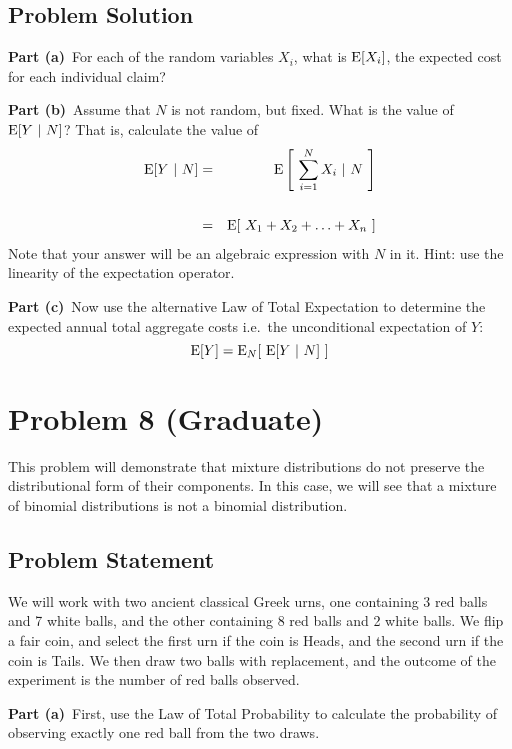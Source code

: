 \documentclass[12pt]{article}
\theoremstyle{definition}
\begin{document}
\subsection*{Problem Solution}

\bigskip
\noindent
{\bf Part (a)}\ For each of the random variables $X_i$, what is $\hbox{E}[X_i]$, the expected cost for each individual claim?


\newpage
\noindent
{\bf Part (b)}\ Assume that $N$ is not random, but fixed. What is the value of $\hbox{E}[Y\ |\ N]$? That is, calculate the value of 
\begin{eqnarray*}
	\hbox{E}[ Y\ |\ N] & = & \hbox{E} \left [\ \sum_{i=1}^N X_i\ |\ N\ \right ]\\
	\\
	& = & \hbox{E}[\ X_1 + X_2 + \ldots + X_n\ ]
\end{eqnarray*}
Note that your answer will be an algebraic expression with $N$ in it. Hint: use the linearity of the expectation operator.

\vspace{3in}
\noindent
{\bf Part (c)}\ Now use the alternative Law of Total Expectation to determine the expected annual total aggregate costs i.e.\ the unconditional expectation of $Y$:
$$
\hbox{E}[ Y ] = \hbox{E}_N[\ \hbox{E}[ Y\ |\ N]\ ]
$$

\newpage
\section*{Problem 8 (Graduate)}

This problem will demonstrate that mixture distributions do not preserve the distributional form of their components. In this case, we will see that a mixture of binomial distributions is not a binomial distribution.

\subsection*{Problem Statement}

We will work with two ancient classical Greek urns, one containing 3 red balls and 7 white balls, and the other containing 8 red balls and 2 white balls. We flip a fair coin, and select the first urn if the coin is Heads, and the second urn if the coin is Tails. We then draw two balls with replacement, and the outcome of the experiment is the number of red balls observed.

\bigskip
\noindent
{\bf Part (a)}\ First, use the Law of Total Probability to calculate the probability of observing exactly one red ball from the two draws.
\end{document}
